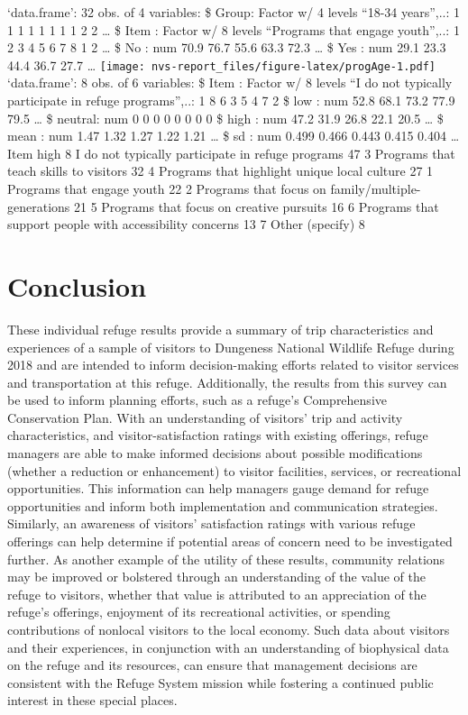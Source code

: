 \documentclass[]{book}
\begin{document}
`data.frame': 32 obs. of 4 variables: \$ Group: Factor w/ 4 levels
``18-34 years'',..: 1 1 1 1 1 1 1 1 2 2 \ldots{} \$ Item : Factor w/ 8
levels ``Programs that engage youth'',..: 1 2 3 4 5 6 7 8 1 2 \ldots{}
\$ No : num 70.9 76.7 55.6 63.3 72.3 \ldots{} \$ Yes : num 29.1 23.3
44.4 36.7 27.7 \ldots{}
\texttt{[image: nvs-report\_files/figure-latex/progAge-1.pdf]}
`data.frame': 8 obs. of 6 variables: \$ Item : Factor w/ 8 levels ``I do
not typically participate in refuge programs'',..: 1 8 6 3 5 4 7 2 \$
low : num 52.8 68.1 73.2 77.9 79.5 \ldots{} \$ neutral: num 0 0 0 0 0 0
0 0 \$ high : num 47.2 31.9 26.8 22.1 20.5 \ldots{} \$ mean : num 1.47
1.32 1.27 1.22 1.21 \ldots{} \$ sd : num 0.499 0.466 0.443 0.415 0.404
\ldots{} Item high 8 I do not typically participate in refuge programs
47 3 Programs that teach skills to visitors 32 4 Programs that highlight
unique local culture 27 1 Programs that engage youth 22 2 Programs that
focus on family/multiple-generations 21 5 Programs that focus on
creative pursuits 16 6 Programs that support people with accessibility
concerns 13 7 Other (specify) 8

\chapter{Conclusion}\label{concl}

These individual refuge results provide a summary of trip
characteristics and experiences of a sample of visitors to Dungeness
National Wildlife Refuge during 2018 and are intended to inform
decision-making efforts related to visitor services and transportation
at this refuge. Additionally, the results from this survey can be used
to inform planning efforts, such as a refuge's Comprehensive
Conservation Plan. With an understanding of visitors' trip and activity
characteristics, and visitor-satisfaction ratings with existing
offerings, refuge managers are able to make informed decisions about
possible modifications (whether a reduction or enhancement) to visitor
facilities, services, or recreational opportunities. This information
can help managers gauge demand for refuge opportunities and inform both
implementation and communication strategies. Similarly, an awareness of
visitors' satisfaction ratings with various refuge offerings can help
determine if potential areas of concern need to be investigated further.
As another example of the utility of these results, community relations
may be improved or bolstered through an understanding of the value of
the refuge to visitors, whether that value is attributed to an
appreciation of the refuge's offerings, enjoyment of its recreational
activities, or spending contributions of nonlocal visitors to the local
economy. Such data about visitors and their experiences, in conjunction
with an understanding of biophysical data on the refuge and its
resources, can ensure that management decisions are consistent with the
Refuge System mission while fostering a continued public interest in
these special places.
\end{document}

